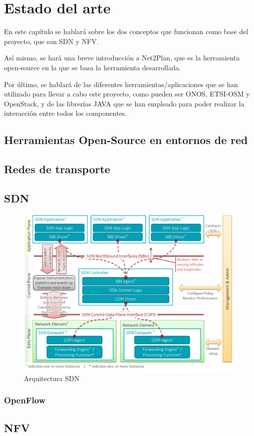 \chapter{Estado del arte}
En este capítulo se hablará sobre los dos conceptos que funcionan como base del proyecto, que son SDN y NFV.

Así mismo, se hará una breve introducción a Net2Plan, que es la herramienta open-source en la que se basa la herramienta desarrollada.

Por último, se hablará de las diferentes herramientas/aplicaciones que se han utilizado para llevar a cabo este proyecto, como pueden ser ONOS, ETSI-OSM y OpenStack, y de las librerías JAVA que se han empleado para poder realizar la interacción entre todos los componentes.


\section{Herramientas Open-Source en entornos de red}
\label{sec:opensourceentornored}

\section{Redes de transporte}
\label{sec:redestransporte}

\section{SDN}
\label{sec:sdn}

\begin{figure}[!ht]
	\centering
	\includegraphics[width=0.75\linewidth]{imagenes/arquitectura_sdn}
	\caption{Arquitectura SDN}
	\label{fig:arquitecturasdn}
\end{figure}

\subsection{OpenFlow}
\label{subsec:openflow}

\section{NFV}
\label{sec:nfv}


\cleardoublepage